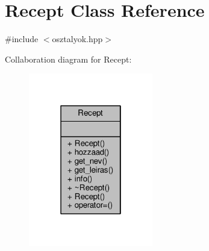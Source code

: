 \hypertarget{class_recept}{}\section{Recept Class Reference}
\label{class_recept}


{\ttfamily \#include $<$osztalyok.\+hpp$>$}



Collaboration diagram for Recept\+:
\nopagebreak
\begin{figure}[H]
\begin{center}
\leavevmode
\includegraphics[width=154pt]{class_recept__coll__graph}
\end{center}
\end{figure}
